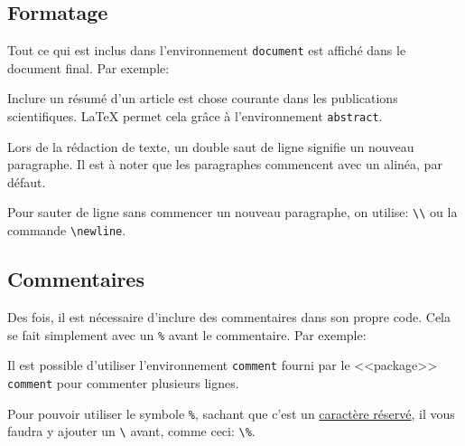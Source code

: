 \subsection{Formatage}

Tout ce qui est inclus dans l'environnement \texttt{document} est affiché dans le document final. Par exemple:



Inclure un résumé d'un article est chose courante dans les publications scientifiques.
\LaTeX{} permet cela grâce à l'environnement \texttt{abstract}.

Lors de la rédaction de texte, un double saut de ligne signifie un nouveau paragraphe.
Il est à noter que les paragraphes commencent avec un alinéa, par défaut.

Pour sauter de ligne sans commencer un nouveau paragraphe, on utilise: \lstinline|\\| ou la commande \lstinline|\newline|.

\subsection{Commentaires}

Des fois, il est nécessaire d'inclure des commentaires dans son propre code.
Cela se fait simplement avec un \texttt{\%} avant le commentaire. Par exemple:



Il est possible d'utiliser l'environnement \texttt{comment} fourni par le <<package>> \texttt{comment} pour commenter plusieurs lignes.

Pour pouvoir utiliser le symbole \texttt{\%}, sachant que c'est un \hyperref[symbols]{caractère réservé}, il vous faudra y ajouter un \texttt{\textbackslash} avant, comme ceci: \texttt{\textbackslash\%}.
